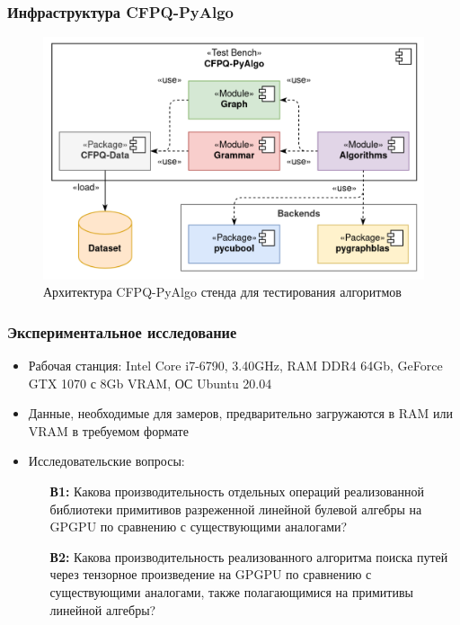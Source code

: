 \documentclass[aspectratio=169,xcolor=table,english]{beamer}
\begin{document}
\begin{frame}[fragile] \frametitle{Инфраструктура CFPQ-PyAlgo}
    \begin{center}
     \begin{minipage}[m]{0.65\linewidth}
        \begin{figure}
            \centering
            \includegraphics[width=\textwidth]{figures/cfpq_py_algo.png}
            \caption{Архитектура CFPQ-PyAlgo стенда для тестирования алгоритмов}
        \end{figure}
    \end{minipage}\hfill   
    \end{center}
\end{frame}

\begin{frame}[fragile] \frametitle{Экспериментальное исследование}
    \begin{itemize}
        \item Рабочая станция: Intel Core i7-6790, 3.40GHz, RAM DDR4 64Gb, GeForce GTX 1070 с 8Gb VRAM, ОС Ubuntu 20.04
        \item Данные, необходимые для замеров, предварительно загружаются в RAM или VRAM в требуемом формате
        \item Исследовательские вопросы:
        {
        \begin{itemize}
            \item[\textbf{В1:}] Какова производительность отдельных операций реализованной библиотеки примитивов разреженной линейной булевой алгебры на GPGPU по сравнению с существующими аналогами?
   
           \item[\textbf{В2:}] Какова производительность реализованного алгоритма поиска путей через тензорное произведение на GPGPU  по сравнению с существующими аналогами, также полагающимися на примитивы линейной алгебры?  
        \end{itemize}
        }
    \end{itemize}
\end{frame}
\end{document}
